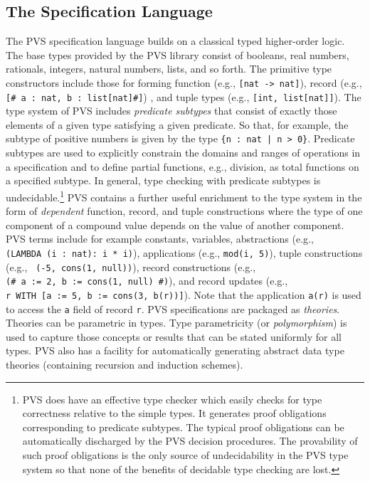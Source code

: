 \subsection{The Specification Language}

The     PVS   specification language builds      on  a classical typed
higher-order   logic.  The  base  types  provided  by  the PVS library
consist of   booleans,  real  numbers,  rationals,  integers,  natural
numbers, lists, and so forth.  The primitive type constructors include
those for forming function (e.g., {\tt [nat\ ->\ nat]}), record (e.g.,
{\tt [\#\ a\ :\  nat,\ b\ :\ list[nat]\#]}) ,  and tuple  types (e.g.,
{\tt  [int,\   list[nat]]}).  The  type  system  of PVS  includes {\em
predicate subtypes\/}  that  consist of  exactly  those elements  of a
given  type satisfying a  given predicate.  So  that, for example, the
subtype of positive numbers is given by the  type {\tt \{n\ :\ nat\ |\
n\ >\  0\}}.  Predicate subtypes are  used to explicitly constrain the
domains and ranges of  operations  in a  specification and to   define
partial functions, e.g., division, as  total functions on a  specified
subtype.   In  general,   type checking   with  predicate  subtypes  is
undecidable.\footnote{PVS  does have  an effective  type checker  which
easily checks  for type correctness relative  to the simple types.  It
generates proof obligations  corresponding to predicate subtypes.  The
typical proof obligations  can be automatically  discharged by the PVS
decision procedures.  The provability of such proof obligations is the
only source of undecidability  in the PVS  type system so that none of
the   benefits  of decidable type checking   are  lost.} PVS contains a
further useful enrichment  to  the  type system in  the  form  of {\em
dependent\/} function, record, and  tuple constructions where the type
of one component  of a compound value depends  on the value of another
component.   PVS terms  include   for  example constants,   variables,
abstractions (e.g.,    {\tt  (LAMBDA\ (i\   :\ nat):\    i\  *\  i)}),
applications (e.g., {\tt mod(i,\ 5)}), tuple constructions (e.g., {\tt
(-5,\ cons(1,\ null))}), record  constructions (e.g., {\tt (\#\ a\ :=\
2,\ b\  :=\ cons(1,\ null)\  \#)}), and record  updates (e.g., {\tt r\
WITH\ [a\ :=\ 5,\ b\ :=\ cons(3,\ b(r))]}).  Note that the application
{\tt a(r)} is used to access the {\tt a} field of record {\tt r}.  PVS
specifications  are packaged  as  {\em theories\/}.    Theories can be
parametric in types.   Type parametricity (or {\em polymorphism\/}) is
used to capture those concepts or results that can be stated uniformly
for all  types.  PVS also has  a facility for automatically generating
abstract    data type   theories  (containing recursion  and  induction
schemes).


